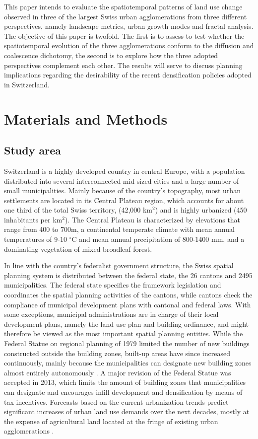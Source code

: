 This paper intends to evaluate the spatiotemporal patterns of land use change observed in three of the largest Swiss urban agglomerations from three different perspectives, namely landscape metrics, urban growth modes and fractal analysis. 
The objective of this paper is twofold.
The first is to assess to test whether the spatiotemporal evolution of the three agglomerations conform to the diffusion and coalescence dichotomy, the second is to explore how the three adopted perspectives complement each other.
The results will serve to discuss planning implications regarding the desirability of the recent densification policies adopted in Switzerland.

\section*{Materials and Methods}

\subsection*{Study area}

Switzerland is a highly developed country in central Europe, with a population distributed into several interconnected mid-sized cities and a large number of small municipalities.
Mainly because of the country's topography, most urban settlements are located in its Central Plateau region, which accounts for about one third of the total Swiss territory, (42,000 km$^2$) and is highly urbanized (450 inhabitants per km$^2$).
The Central Plateau is characterized by elevations that range from 400 to 700m, a continental temperate climate with mean annual temperatures of 9-10 $^{\circ}$C and mean annual precipitation of 800-1400 mm, and a dominating vegetation of mixed broadleaf forest.

In line with the country's federalist government structure, the Swiss spatial planning system is distributed between the federal state, the 26 cantons and 2495 municipalities. The federal state specifies the framework legislation and coordinates the spatial planning activities of the cantons, while cantons check the compliance of municipal development plans with cantonal and federal laws. With some exceptions, municipal administrations are in charge of their local development plans, namely the land use plan and building ordinance, and might therefore be viewed as the most important spatial planning entities.
While the Federal Statue on regional planning of 1979 limited the number of new buildings constructed outside the building zones, built-up areas have since increased continuously, mainly because the municipalities can designate new building zones almost entirely autonomously \citep{jaeger2014improving}. A major revision of the Federal Statue was accepted in 2013, which limits the amount of building zones that municipalities can designate and encourages infill development and densification by means of tax incentives.
Forecasts based on the current urbanization trends predict significant increases of urban land use demands over the next decades, mostly at the expense of agricultural land located at the fringe of existing urban agglomerations \citep{price2015future}.

